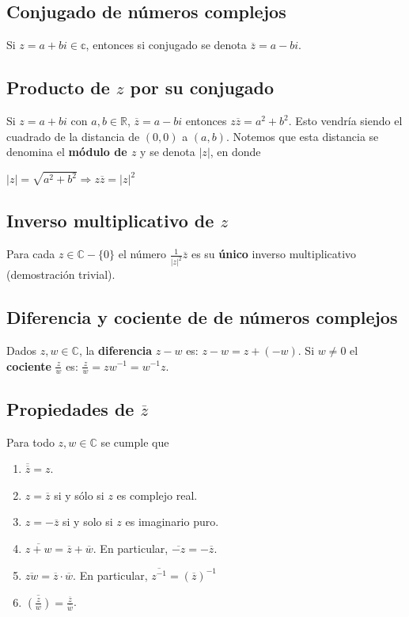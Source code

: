 \documentclass{article}
\begin{document}
\subsection{Conjugado de números complejos}
Si $z=a+bi\in \mathbb{c}$, entonces si conjugado se denota $\overline{z}=a-bi$.

\subsection{Producto de $z$ por su conjugado}
Si $z=a+bi$ con $a,b\in \mathbb{R}$, $\overline{z}=a-bi$ entonces $z\overline{z}=a^2+b^2$. Esto vendría siendo el cuadrado de la distancia de $(0,0)$ a $(a,b)$. Notemos que esta distancia se denomina el \textbf{módulo de $z$} y se denota $|z|$, en donde 
\begin{center}
    $|z|=\sqrt{a^2+b^2} \Rightarrow z\overline{z}=|z|^2$
\end{center}

\subsection{Inverso multiplicativo de $z$}
Para cada $z\in \mathbb{C}-\{0\}$ el número $\frac{1}{|z|^2}\overline{z}$ es su \textbf{único} inverso multiplicativo (demostración trivial).

\subsection{Diferencia y cociente de de números complejos}
Dados $z,w\in \mathbb{C}$, la \textbf{diferencia} $z-w$ es: $z-w=z+(-w)$. Si $w\ne0$ el \textbf{cociente} $\frac{z}{w}$ es: $\frac{z}{w}=zw^{-1}=w^{-1}z$.

\subsection{Propiedades de $\overline{z}$}
Para todo $z,w\in \mathbb{C}$ se cumple que
\begin{enumerate}
    \item $\overline{\overline{z}}=z$.
    \item $z=\overline{z}$ si y sólo si $z$ es complejo real.
    \item $z=-\overline{z}$ si y solo si $z$ es imaginario puro.
    \item $\overline{z+w}=\overline{z}+\overline{w}$. En particular, $\overline{-z}=-\overline{z}$.
    \item $\overline{zw}=\overline{z}\cdot\overline{w}$. En particular, $\overline{z^{-1}}=(\overline{z})^{-1}$
    \item $\overline{(\frac{z}{w})}=\frac{\overline{z}}{\overline{w}}$.
\end{enumerate}
\end{document}
